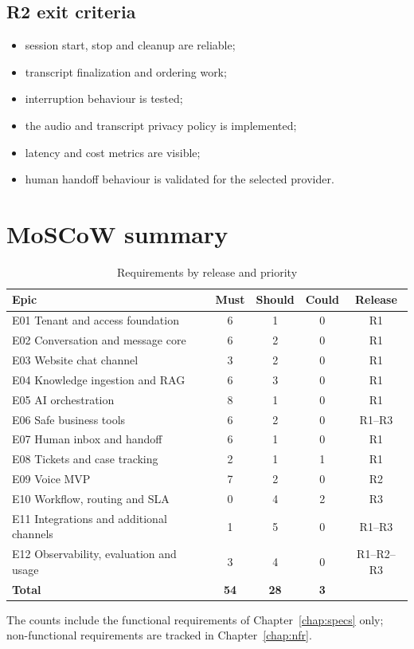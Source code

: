 \subsection{R2 exit criteria}
\begin{itemize}
  \item session start, stop and cleanup are reliable;
  \item transcript finalization and ordering work;
  \item interruption behaviour is tested;
  \item the audio and transcript privacy policy is implemented;
  \item latency and cost metrics are visible;
  \item human handoff behaviour is validated for the selected provider.
\end{itemize}

\section{MoSCoW summary}
\begin{table}[htbp]
\centering\caption{Requirements by release and priority}\label{tab:moscow}
\begin{tabular}{@{}lcccc@{}}
\toprule \textbf{Epic} & \textbf{Must} & \textbf{Should} & \textbf{Could} & \textbf{Release} \\ \midrule
E01 Tenant and access foundation & 6 & 1 & 0 & R1 \\
E02 Conversation and message core & 6 & 2 & 0 & R1 \\
E03 Website chat channel & 3 & 2 & 0 & R1 \\
E04 Knowledge ingestion and RAG & 6 & 3 & 0 & R1 \\
E05 AI orchestration & 8 & 1 & 0 & R1 \\
E06 Safe business tools & 6 & 2 & 0 & R1--R3 \\
E07 Human inbox and handoff & 6 & 1 & 0 & R1 \\
E08 Tickets and case tracking & 2 & 1 & 1 & R1 \\
E09 Voice MVP & 7 & 2 & 0 & R2 \\
E10 Workflow, routing and SLA & 0 & 4 & 2 & R3 \\
E11 Integrations and additional channels & 1 & 5 & 0 & R1--R3 \\
E12 Observability, evaluation and usage & 3 & 4 & 0 & R1--R2--R3 \\
\midrule
\textbf{Total} & \textbf{54} & \textbf{28} & \textbf{3} & \\
\bottomrule
\end{tabular}
\end{table}
The counts include the functional requirements of Chapter~\ref{chap:specs} only; non-functional requirements are tracked in Chapter~\ref{chap:nfr}.

